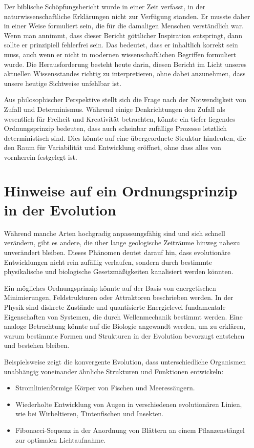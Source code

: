 \documentclass{article}
\begin{document}
	Der biblische Schöpfungsbericht wurde in einer Zeit verfasst, in der naturwissenschaftliche Erklärungen nicht zur Verfügung standen. Er musste daher in einer Weise formuliert sein, die für die damaligen Menschen verständlich war. Wenn man annimmt, dass dieser Bericht göttlicher Inspiration entspringt, dann sollte er prinzipiell fehlerfrei sein. Das bedeutet, dass er inhaltlich korrekt sein muss, auch wenn er nicht in modernen wissenschaftlichen Begriffen formuliert wurde. Die Herausforderung besteht heute darin, diesen Bericht im Licht unseres aktuellen Wissensstandes richtig zu interpretieren, ohne dabei anzunehmen, dass unsere heutige Sichtweise unfehlbar ist.
	
	Aus philosophischer Perspektive stellt sich die Frage nach der Notwendigkeit von Zufall und Determinismus. Während einige Denkrichtungen den Zufall als wesentlich für Freiheit und Kreativität betrachten, könnte ein tiefer liegendes Ordnungsprinzip bedeuten, dass auch scheinbar zufällige Prozesse letztlich deterministisch sind. Dies könnte auf eine übergeordnete Struktur hindeuten, die den Raum für Variabilität und Entwicklung eröffnet, ohne dass alles von vornherein festgelegt ist.
	
	\section{Hinweise auf ein Ordnungsprinzip in der Evolution}
	Während manche Arten hochgradig anpassungsfähig sind und sich schnell verändern, gibt es andere, die über lange geologische Zeiträume hinweg nahezu unverändert bleiben. Dieses Phänomen deutet darauf hin, dass evolutionäre Entwicklungen nicht rein zufällig verlaufen, sondern durch bestimmte physikalische und biologische Gesetzmäßigkeiten kanalisiert werden könnten.
	
	Ein mögliches Ordnungsprinzip könnte auf der Basis von energetischen Minimierungen, Feldstrukturen oder Attraktoren beschrieben werden. In der Physik sind diskrete Zustände und quantisierte Energielevel fundamentale Eigenschaften von Systemen, die durch Wellenmechanik bestimmt werden. Eine analoge Betrachtung könnte auf die Biologie angewandt werden, um zu erklären, warum bestimmte Formen und Strukturen in der Evolution bevorzugt entstehen und bestehen bleiben.
	
	Beispielsweise zeigt die konvergente Evolution, dass unterschiedliche Organismen unabhängig voneinander ähnliche Strukturen und Funktionen entwickeln:
	\begin{itemize}
		\item Stromlinienförmige Körper von Fischen und Meeressäugern.
		\item Wiederholte Entwicklung von Augen in verschiedenen evolutionären Linien, wie bei Wirbeltieren, Tintenfischen und Insekten.
		\item Fibonacci-Sequenz in der Anordnung von Blättern an einem Pflanzenstängel zur optimalen Lichtaufnahme.
	\end{itemize}
	
\end{document}

